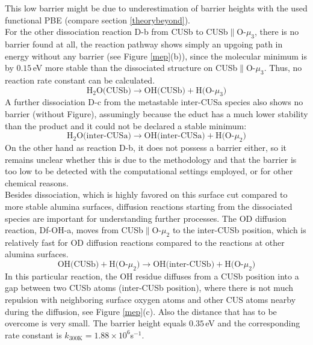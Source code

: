 \documentclass[11pt,DIV=13,BCOR=5mm,a4paper,headinclude]{scrbook}
\begin{document}
This low barrier might be due to underestimation of barrier heights\cite{Zhao05} with the used functional PBE (compare section \ref{theorybeyond}).
\\ 
For the other dissociation reaction D-b from CUSb to CUSb$\parallel$O-$\mu_3$, there is no barrier found at all, the reaction pathway shows simply an upgoing path in energy without any barrier (see Figure \ref{mep}(b)), since the molecular minimum is by $0.15\,$eV more stable than the dissociated structure on CUSb$\parallel$O-$\mu_3$.
Thus, no reaction rate constant can be calculated.
\begin{equation}
  \text{H$_2$O(CUSb)} \rightarrow \text{OH(CUSb)} + \text{H(O-$\mu_3$)} \tag{D-b}
      \label{dissb}
\end{equation}
A further dissociation D-c from the metastable inter-CUSa species also shows no barrier (without Figure), assumingly because the educt  has a much lower stability than the product and it could not be declared a stable minimum:
\begin{equation}
  \text{H$_2$O(inter-CUSa)} \rightarrow \text{OH(inter-CUSa)} + \text{H(O-$\mu_2$)} \tag{D-c}
      \label{dissc}
\end{equation}
On the other hand as reaction D-b, it does not possess a barrier either, so it remains unclear whether this is due to the methodology and that the barrier is too low to be detected with the computational settings employed, or for other chemical reasons.
\\
Besides dissociation, which is highly favored on this surface cut compared to more stable alumina surfaces\cite{Heiden11-20_2018}, diffusion reactions starting from the dissociated species are important for understanding further processes.
The OD diffusion reaction, Df-OH-a, moves from CUSb$\parallel$O-$\mu_2$ to the inter-CUSb position, which is relatively fast for OD diffusion reactions compared to the reactions at other alumina surfaces\cite{WirthJPCC2012,Wirth2016}.
\begin{equation}
 \text{OH(CUSb)} + \text{H(O-$\mu_2$)} \rightarrow \text{OH(inter-CUSb)} + \text{H(O-$\mu_2$)} \tag{Df-OH-a}
     \label{diffOHa}
\end{equation}
In this particular reaction, the OH residue diffuses from a CUSb position into a gap between two CUSb atoms (inter-CUSb position), where there is not much repulsion with neighboring surface oxygen atoms and other CUS atoms nearby during the diffusion, see Figure \ref{mep}(c).
Also the distance that has to be overcome is very small.
The barrier height equals $0.35\,$eV and the corresponding rate constant is $k_{\text{300K}}=1.88\times 10^6$s$^{-1}$.
\end{document}
